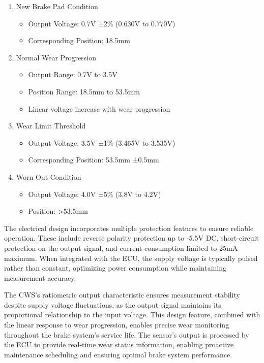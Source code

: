 \documentclass[12pt]{article}
\begin{document}
\begin{enumerate} \item New Brake Pad Condition \begin{itemize} \item Output
Voltage: 0.7V ±2\% (0.630V to 0.770V) \item Corresponding Position: 18.5mm
\end{itemize} \item Normal Wear Progression \begin{itemize} \item Output Range:
0.7V to 3.5V \item Position Range: 18.5mm to 53.5mm \item Linear voltage
increase with wear progression \end{itemize} \item Wear Limit Threshold
\begin{itemize} \item Output Voltage: 3.5V ±1\% (3.465V to 3.535V) \item
Corresponding Position: 53.5mm ±0.5mm \end{itemize} \item Worn Out Condition
\begin{itemize} \item Output Voltage: 4.0V ±5\% (3.8V to 4.2V) \item Position:
>53.5mm \end{itemize} \end{enumerate}

The electrical design incorporates multiple protection features to ensure
reliable operation. These include reverse polarity protection up to -5.5V DC,
short-circuit protection on the output signal, and current consumption limited
to 25mA maximum. When integrated with the ECU, the supply voltage is typically
pulsed rather than constant, optimizing power consumption while maintaining
measurement accuracy.

The CWS's ratiometric output characteristic ensures measurement stability
despite supply voltage fluctuations, as the output signal maintains its
proportional relationship to the input voltage. This design feature, combined
with the linear response to wear progression, enables precise wear monitoring
throughout the brake system's service life. The sensor's output is processed by
the ECU to provide real-time wear status information, enabling proactive
maintenance scheduling and ensuring optimal brake system performance.
\end{document}
